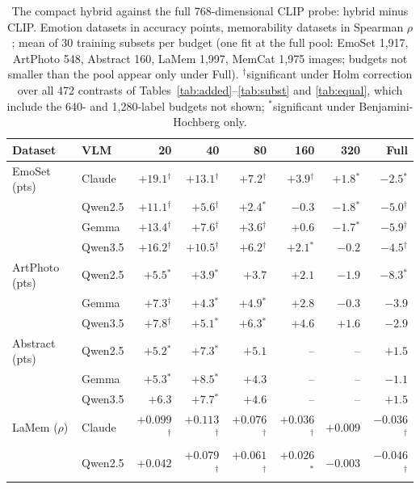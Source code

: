 \begin{table}[t]
\centering
\caption{The compact hybrid against the full 768-dimensional CLIP probe: hybrid minus CLIP. Emotion datasets in accuracy points, memorability datasets in Spearman $\rho$; mean of 30 training subsets per budget (one fit at the full pool: EmoSet 1,917, ArtPhoto 548, Abstract 160, LaMem 1,997, MemCat 1,975 images; budgets not smaller than the pool appear only under Full). $^{\dagger}$significant under Holm correction over all 472 contrasts of Tables~\ref{tab:added}--\ref{tab:subst} and \ref{tab:equal}, which include the 640- and 1,280-label budgets not shown; $^{*}$significant under Benjamini-Hochberg only.}
\label{tab:vsclip}
\footnotesize
\setlength{\tabcolsep}{4pt}
\begin{tabular}{@{}llrrrrrr@{}}
\toprule
Dataset & VLM & 20 & 40 & 80 & 160 & 320 & Full \\
\midrule
EmoSet (pts) & Claude & $+19.1$$^{\dagger}$ & $+13.1$$^{\dagger}$ & $+7.2$$^{\dagger}$ & $+3.9$$^{\dagger}$ & $+1.8$$^{*}$ & $-2.5$$^{*}$ \\
 & Qwen2.5 & $+11.1$$^{\dagger}$ & $+5.6$$^{\dagger}$ & $+2.4$$^{*}$ & $-0.3$ & $-1.8$$^{*}$ & $-5.0$$^{\dagger}$ \\
 & Gemma & $+13.4$$^{\dagger}$ & $+7.6$$^{\dagger}$ & $+3.6$$^{\dagger}$ & $+0.6$ & $-1.7$$^{*}$ & $-5.9$$^{\dagger}$ \\
 & Qwen3.5 & $+16.2$$^{\dagger}$ & $+10.5$$^{\dagger}$ & $+6.2$$^{\dagger}$ & $+2.1$$^{*}$ & $-0.2$ & $-4.5$$^{\dagger}$ \\
\addlinespace
ArtPhoto (pts) & Qwen2.5 & $+5.5$$^{*}$ & $+3.9$$^{*}$ & $+3.7$ & $+2.1$ & $-1.9$ & $-8.3$$^{*}$ \\
 & Gemma & $+7.3$$^{\dagger}$ & $+4.3$$^{*}$ & $+4.9$$^{*}$ & $+2.8$ & $-0.3$ & $-3.9$ \\
 & Qwen3.5 & $+7.8$$^{\dagger}$ & $+5.1$$^{*}$ & $+6.3$$^{*}$ & $+4.6$ & $+1.6$ & $-2.9$ \\
\addlinespace
Abstract (pts) & Qwen2.5 & $+5.2$$^{*}$ & $+7.3$$^{*}$ & $+5.1$ & -- & -- & $+1.5$ \\
 & Gemma & $+5.3$$^{*}$ & $+8.5$$^{*}$ & $+4.3$ & -- & -- & $-1.1$ \\
 & Qwen3.5 & $+6.3$ & $+7.7$$^{*}$ & $+4.6$ & -- & -- & $+1.5$ \\
\addlinespace
LaMem ($\rho$) & Claude & $+0.099$$^{\dagger}$ & $+0.113$$^{\dagger}$ & $+0.076$$^{\dagger}$ & $+0.036$$^{\dagger}$ & $+0.009$ & $-0.036$$^{\dagger}$ \\
 & Qwen2.5 & $+0.042$ & $+0.079$$^{\dagger}$ & $+0.061$$^{\dagger}$ & $+0.026$$^{*}$ & $-0.003$ & $-0.046$$^{\dagger}$ \\

\end{tabular}
\end{table}
